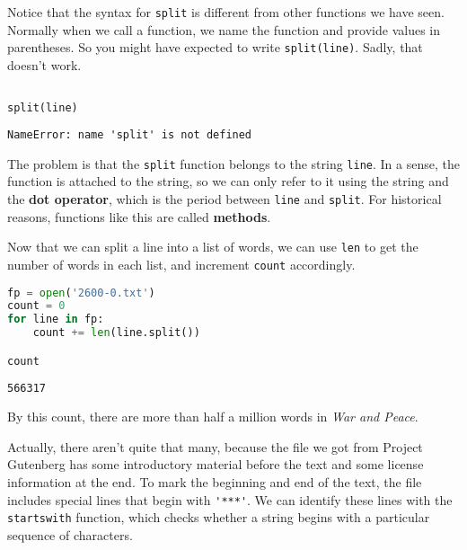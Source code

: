 Notice that the syntax for \passthrough{\lstinline!split!} is different
from other functions we have seen. Normally when we call a function, we
name the function and provide values in parentheses. So you might have
expected to write \passthrough{\lstinline!split(line)!}. Sadly, that
doesn't work.

\begin{lstlisting}[language=Python,style=source]
%%expect NameError

split(line)
\end{lstlisting}

\begin{lstlisting}[style=output]
NameError: name 'split' is not defined
\end{lstlisting}

The problem is that the \passthrough{\lstinline!split!} function belongs
to the string \passthrough{\lstinline!line!}. In a sense, the function
is attached to the string, so we can only refer to it using the string
and the \textbf{dot operator}, which is the period between
\passthrough{\lstinline!line!} and \passthrough{\lstinline!split!}. For
historical reasons, functions like this are called \textbf{methods}.

Now that we can split a line into a list of words, we can use
\passthrough{\lstinline!len!} to get the number of words in each list,
and increment \passthrough{\lstinline!count!} accordingly.

\begin{lstlisting}[language=Python,style=source]
fp = open('2600-0.txt')
count = 0
for line in fp:
    count += len(line.split())

count
\end{lstlisting}

\begin{lstlisting}[style=output]
566317
\end{lstlisting}

By this count, there are more than half a million words in \emph{War and
Peace}.

Actually, there aren't quite that many, because the file we got from
Project Gutenberg has some introductory material before the text and
some license information at the end. To mark the beginning and end of
the text, the file includes special lines that begin with
\passthrough{\lstinline!'***'!}. We can identify these lines with the
\passthrough{\lstinline!startswith!} function, which checks whether a
string begins with a particular sequence of characters.

